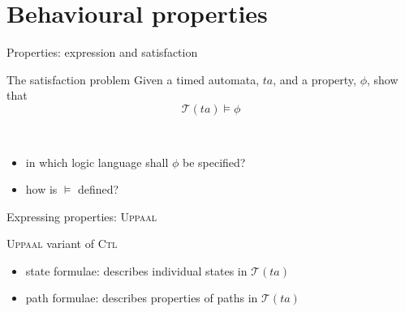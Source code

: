 \documentclass{beamer}
\def\dgold#1{{\darkgoldenrod #1}}
\def\dkb#1{{\blue #1}}
\def\TL#1{\mathcal{T}(#1)}
\begin{document}
\section{Behavioural properties}
\begin{slide}{Properties: expression and satisfaction}
\small
\begin{block}{The satisfaction problem }
Given a \dgold{timed automata}, $ta$, and a \dkb{property}, $\phi$, show that
\begin{equation*}
\TL{ta} \models \phi
\end{equation*}
\end{block}
~\\

\pause
\begin{itemize}
\item in which logic language shall $\phi$ be specified?
\item how is $\models$ defined?
\end{itemize}
\end{slide}




\begin{slide}{Expressing properties: \textsc{Uppaal}}
\small

\begin{block}{\textsc{Uppaal} variant of \textsc{Ctl}}
\begin{itemize}
\item \dkb{state formulae}:  describes individual states in $\TL{ta}$
\item \dkb{path formulae}: describes properties of paths in $\TL{ta}$
\end{itemize}
\end{block}

\end{slide}
\end{document}
